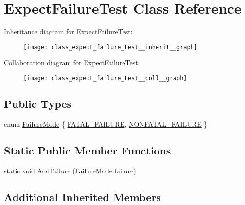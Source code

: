 \hypertarget{class_expect_failure_test}{}\section{Expect\+Failure\+Test Class Reference}
\label{class_expect_failure_test}


Inheritance diagram for Expect\+Failure\+Test\+:
\nopagebreak
\begin{figure}[H]
\begin{center}
\leavevmode
\texttt{[image: class\_expect\_failure\_test\_\_inherit\_\_graph]}
\end{center}
\end{figure}


Collaboration diagram for Expect\+Failure\+Test\+:
\nopagebreak
\begin{figure}[H]
\begin{center}
\leavevmode
\texttt{[image: class\_expect\_failure\_test\_\_coll\_\_graph]}
\end{center}
\end{figure}
\subsection*{Public Types}
\begin{DoxyCompactItemize}
\item 
enum \hyperlink{class_expect_failure_test_aad05da10bb15d21a434eba3b37011406}{Failure\+Mode} \{ \hyperlink{class_expect_failure_test_aad05da10bb15d21a434eba3b37011406a3d618496b7e2a2c256e02186bddee4ec}{F\+A\+T\+A\+L\+\_\+\+F\+A\+I\+L\+U\+RE}, 
\hyperlink{class_expect_failure_test_aad05da10bb15d21a434eba3b37011406aeabdbecc0c4550d4f46cd44ac62fb92b}{N\+O\+N\+F\+A\+T\+A\+L\+\_\+\+F\+A\+I\+L\+U\+RE}
 \}
\end{DoxyCompactItemize}
\subsection*{Static Public Member Functions}
\begin{DoxyCompactItemize}
\item 
static void \hyperlink{class_expect_failure_test_ab9aeb7820ff7953fc2975ecc5abd046b}{Add\+Failure} (\hyperlink{class_expect_failure_test_aad05da10bb15d21a434eba3b37011406}{Failure\+Mode} failure)
\end{DoxyCompactItemize}
\subsection*{Additional Inherited Members}


